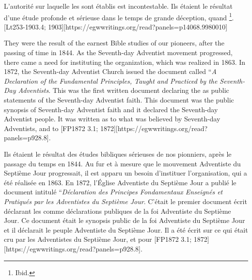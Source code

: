 L'autorité sur laquelle les  sont établis est incontestable. Ils étaient le résultat d'une étude profonde et sérieuse dans le temps de grande déception, quand \footnote{Ibid.}. [Lt253-1903.4; 1903][https://egwwritings.org/read?panels=p14068.9980010]


They were the result of the earnest Bible studies of our pioneers, after the passing of time in 1844. As the Seventh-day Adventist movement progressed, there came a need for instituting the organization, which was realized in 1863. In 1872, the Seventh-day Adventist Church issued the document called “\textit{A Declaration of the Fundamental Principles, Taught and Practiced by the Seventh-Day Adventists}. This was the first written document declaring the  as public statements of the Seventh-day Adventist faith. This document was the public synopsis of Seventh-day Adventist faith and it declared  the Seventh-day Adventist people. It was written  as to what was believed by Seventh-day Adventists,  and to [FP1872 3.1; 1872][https://egwwritings.org/read?panels=p928.8].


Ils étaient le résultat des études bibliques sérieuses de nos pionniers, après le passage du temps en 1844. Au fur et à mesure que le mouvement Adventiste du Septième Jour progressait, il est apparu un besoin d'instituer l'organisation, qui a été réalisée en 1863. En 1872, l'Église Adventiste du Septième Jour a publié le document intitulé “\textit{Déclaration des Principes Fondamentaux Enseignés et Pratiqués par les Adventistes du Septième Jour}. C'était le premier document écrit déclarant les  comme déclarations publiques de la foi Adventiste du Septième Jour. Ce document était le synopsis public de la foi Adventiste du Septième Jour et il déclarait  le peuple Adventiste du Septième Jour. Il a été écrit  sur ce qui était cru par les Adventistes du Septième Jour,  et pour [FP1872 3.1; 1872][https://egwwritings.org/read?panels=p928.8].


